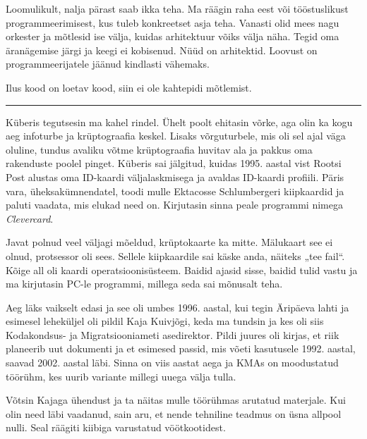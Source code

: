 
Loomulikult, nalja pärast saab ikka teha. Ma räägin raha 
eest või tööstuslikust programmeerimisest, kus tuleb konkreetset asja teha. 
Vanasti olid mees nagu orkester ja mõtlesid ise välja, kuidas arhitektuur 
võiks välja näha. Tegid oma äranägemise järgi ja keegi ei kobisenud. Nüüd 
on arhitektid. Loovust on 
programmeerijatele jäänud kindlasti vähemaks. 


Ilus kood on loetav kood, siin ei ole kahtepidi mõtlemist. 

\bigskip
\noindent\rule{.3\textwidth}{.7pt}
\bigskip


Küberis tegutsesin ma kahel rindel. Ühelt poolt ehitasin võrke, 
aga olin ka kogu aeg infoturbe ja krüptograafia keskel. Lisaks 
võrguturbele, mis oli sel ajal väga oluline, tundus avaliku võtme 
krüptograafia huvitav ala ja pakkus oma rakenduste poolel pinget. 
Küberis sai jälgitud, kuidas 1995. aastal vist Rootsi Post alustas oma 
ID-kaardi väljalaskmisega ja avaldas ID-kaardi profiili. Päris vara, 
üheksakümnendatel, toodi mulle Ektacosse Schlumbergeri 
kiipkaardid ja paluti vaadata, mis elukad need on. 
Kirjutasin sinna peale programmi nimega \emph{Clevercard}.


Javat polnud veel väljagi mõeldud, 
krüptokaarte ka mitte. Mälukaart see ei olnud, protsessor 
oli sees. Sellele kiipkaardile sai käske anda, näiteks „tee fail“. Kõige all oli 
kaardi operatsioonisüsteem. Baidid ajasid sisse, baidid tulid vastu ja ma kirjutasin 
PC-le programmi, millega seda sai mõnusalt teha. 

Aeg läks vaikselt edasi ja see oli umbes 1996.
aastal, kui tegin Äripäeva lahti ja esimesel leheküljel oli pildil Kaja 
Kuivjõgi, keda ma tundsin ja kes 
oli siis Kodakondsus- ja Migratsiooniameti asedirektor. Pildi juures oli kirjas, et riik 
planeerib uut dokumenti ja et esimesed passid, mis võeti kasutusele 1992. aastal, saavad 2002. aastal läbi. 
Sinna on viis aastat aega ja KMAs on moodustatud töörühm, kes 
uurib variante millegi uuega välja tulla. 

Võtsin Kajaga ühendust ja ta 
näitas mulle töörühmas arutatud materjale. Kui olin need 
läbi vaadanud, sain aru, et nende tehniline teadmus on üsna allpool 
nulli. Seal räägiti kiibiga varustatud vöötkootidest. 

